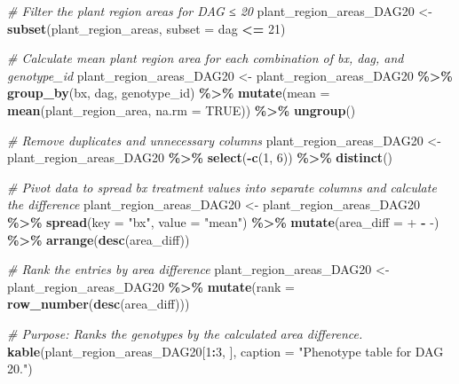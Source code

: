 \documentclass[
  11pt,
]{article}
\newenvironment{Shaded}{\begin{snugshade}}{\end{snugshade}}
\newcommand{\AttributeTok}[1]{\textcolor[rgb]{0.13,0.29,0.53}{#1}}
\newcommand{\CommentTok}[1]{\textcolor[rgb]{0.56,0.35,0.01}{\textit{#1}}}
\newcommand{\ConstantTok}[1]{\textcolor[rgb]{0.56,0.35,0.01}{#1}}
\newcommand{\DecValTok}[1]{\textcolor[rgb]{0.00,0.00,0.81}{#1}}
\newcommand{\FunctionTok}[1]{\textcolor[rgb]{0.13,0.29,0.53}{\textbf{#1}}}
\newcommand{\NormalTok}[1]{#1}
\newcommand{\OtherTok}[1]{\textcolor[rgb]{0.56,0.35,0.01}{#1}}
\newcommand{\SpecialCharTok}[1]{\textcolor[rgb]{0.81,0.36,0.00}{\textbf{#1}}}
\newcommand{\StringTok}[1]{\textcolor[rgb]{0.31,0.60,0.02}{#1}}
\begin{document}
\begin{Shaded}
\begin{Highlighting}[]
\CommentTok{\# Filter the plant region areas for DAG ≤ 20}
\NormalTok{plant\_region\_areas\_DAG20 }\OtherTok{\textless{}{-}} \FunctionTok{subset}\NormalTok{(plant\_region\_areas, }\AttributeTok{subset =}\NormalTok{ dag }\SpecialCharTok{\textless{}=} \DecValTok{21}\NormalTok{)}

\CommentTok{\# Calculate mean plant region area for each combination of bx, dag, and genotype\_id}
\NormalTok{plant\_region\_areas\_DAG20 }\OtherTok{\textless{}{-}}\NormalTok{ plant\_region\_areas\_DAG20 }\SpecialCharTok{\%\textgreater{}\%}
  \FunctionTok{group\_by}\NormalTok{(bx, dag, genotype\_id) }\SpecialCharTok{\%\textgreater{}\%}
  \FunctionTok{mutate}\NormalTok{(}\AttributeTok{mean =} \FunctionTok{mean}\NormalTok{(plant\_region\_area, }\AttributeTok{na.rm =} \ConstantTok{TRUE}\NormalTok{)) }\SpecialCharTok{\%\textgreater{}\%}
  \FunctionTok{ungroup}\NormalTok{()}

\CommentTok{\# Remove duplicates and unnecessary columns}
\NormalTok{plant\_region\_areas\_DAG20 }\OtherTok{\textless{}{-}}\NormalTok{ plant\_region\_areas\_DAG20 }\SpecialCharTok{\%\textgreater{}\%}
  \FunctionTok{select}\NormalTok{(}\SpecialCharTok{{-}}\FunctionTok{c}\NormalTok{(}\DecValTok{1}\NormalTok{, }\DecValTok{6}\NormalTok{)) }\SpecialCharTok{\%\textgreater{}\%}
  \FunctionTok{distinct}\NormalTok{()}

\CommentTok{\# Pivot data to spread \textquotesingle{}bx\textquotesingle{} treatment values into separate columns and calculate the difference}
\NormalTok{plant\_region\_areas\_DAG20 }\OtherTok{\textless{}{-}}\NormalTok{ plant\_region\_areas\_DAG20 }\SpecialCharTok{\%\textgreater{}\%}
  \FunctionTok{spread}\NormalTok{(}\AttributeTok{key =} \StringTok{"bx"}\NormalTok{, }\AttributeTok{value =} \StringTok{"mean"}\NormalTok{) }\SpecialCharTok{\%\textgreater{}\%}
  \FunctionTok{mutate}\NormalTok{(}\AttributeTok{area\_diff =} \StringTok{\textasciigrave{}}\AttributeTok{+}\StringTok{\textasciigrave{}} \SpecialCharTok{{-}} \StringTok{\textasciigrave{}}\AttributeTok{{-}}\StringTok{\textasciigrave{}}\NormalTok{) }\SpecialCharTok{\%\textgreater{}\%}
  \FunctionTok{arrange}\NormalTok{(}\FunctionTok{desc}\NormalTok{(area\_diff))}

\CommentTok{\# Rank the entries by area difference}
\NormalTok{plant\_region\_areas\_DAG20 }\OtherTok{\textless{}{-}}\NormalTok{ plant\_region\_areas\_DAG20 }\SpecialCharTok{\%\textgreater{}\%}
  \FunctionTok{mutate}\NormalTok{(}\AttributeTok{rank =} \FunctionTok{row\_number}\NormalTok{(}\FunctionTok{desc}\NormalTok{(area\_diff)))}

\CommentTok{\# Purpose: Ranks the genotypes by the calculated area difference.}
\FunctionTok{kable}\NormalTok{(plant\_region\_areas\_DAG20[}\DecValTok{1}\SpecialCharTok{:}\DecValTok{3}\NormalTok{, ], }\AttributeTok{caption =} \StringTok{"Phenotype table for DAG 20."}\NormalTok{)}
\end{Highlighting}
\end{Shaded}
\end{document}
